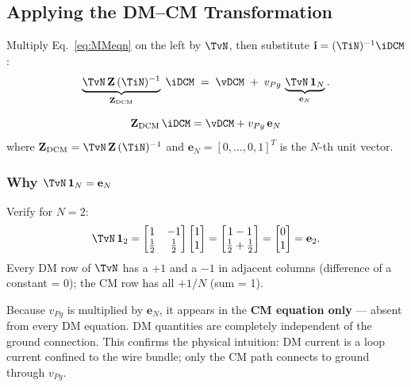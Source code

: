 \subsection{Applying the DM--CM Transformation}

Multiply Eq.~\eqref{eq:MMeqn} on the left by $\TvN$, then
substitute $\mathbf{i} = (\TiN)^{-1}\iDCM$:
\[
    \underbrace{\TvN\,\mathbf{Z}\,(\TiN)^{-1}}_{\mathbf{Z}_{\mathrm{DCM}}}
    \;\iDCM
    \;=\;
    \vDCM
    \;+\; v_{Pg}\,\underbrace{\TvN\,\mathbf{1}_N}_{\mathbf{e}_N}.
\]

\begin{eqnbox}
\begin{equation}
    \mathbf{Z}_{\mathrm{DCM}}\,\iDCM
    = \vDCM + v_{Pg}\,\mathbf{e}_N
    \label{eq:DCMeqn}
\end{equation}
where $\mathbf{Z}_{\mathrm{DCM}} = \TvN\,\mathbf{Z}\,(\TiN)^{-1}$
and $\mathbf{e}_N = [0,\ldots,0,1]^T$ is the $N$-th unit vector.
\end{eqnbox}

\subsubsection*{Why $\TvN\,\mathbf{1}_N = \mathbf{e}_N$}

Verify for $N = 2$:
\[
\TvN\,\mathbf{1}_2
=
\begin{bmatrix}
1 & -1 \\ \tfrac{1}{2} & \tfrac{1}{2}
\end{bmatrix}
\begin{bmatrix}1 \\ 1\end{bmatrix}
=
\begin{bmatrix}1-1 \\ \tfrac{1}{2}+\tfrac{1}{2}\end{bmatrix}
=
\begin{bmatrix}0 \\ 1\end{bmatrix}
= \mathbf{e}_2.
\]
Every DM row of $\TvN$ has a $+1$ and a $-1$ in adjacent columns
(difference of a constant = 0); the CM row has all $+1/N$ (sum = 1).

\begin{statebox}
Because $v_{Pg}$ is multiplied by $\mathbf{e}_N$, it appears in the
\textbf{CM equation only} — absent from every DM equation.
DM quantities are completely independent of the ground connection.
This confirms the physical intuition: DM current is a loop current
confined to the wire bundle; only the CM path connects to ground
through $v_{Pg}$.
\end{statebox}

